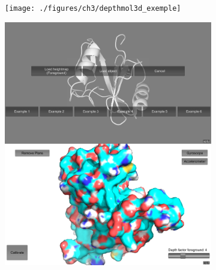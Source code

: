 \begin{figure}[h]
\begin{subfigure}{.5\textwidth}
  \centering
  {\texttt{[image: ./figures/ch3/depthmol3d\_exemple]}}
    \caption{}
  \label{Fig:depthmol3d_exemple}
\end{subfigure}
\begin{subfigure}{.5\textwidth}
  \centering
  {\includegraphics[width=.75\linewidth]{./figures/ch3/depthmol3d_screenshots}}
    \caption{}
  \label{Fig:depthmol3d_screenshots}
\end{subfigure}


\end{figure}
